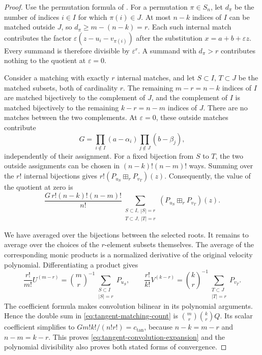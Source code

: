\documentclass[10pt,a4paper]{amsart}
\newcommand{\eps}{\varepsilon}
\begin{document}
\begin{proof}
Use the permutation formula of .  For a
permutation \(\pi\in S_n\), let \(d_\pi\) be the number of indices
\(i\in I\) for which \(\pi(i)\in J\).  At most \(n-k\) indices
of \(I\) can be matched outside \(J\), so
\(d_\pi\geq m-(n-k)=r\).  Each such internal match contributes
the factor \(\eps(z-u_i-v_{\pi(i)})\) after the substitution
\(x=a+b+\eps z\).  Every summand is therefore divisible by
\(\eps^r\).  A summand with \(d_\pi>r\) contributes nothing to
the quotient at \(\eps=0\).

Consider a matching with exactly \(r\) internal matches, and let
\(S\subset I\), \(T\subset J\) be the matched subsets, both of
cardinality \(r\).  The remaining \(m-r=n-k\) indices of \(I\)
are matched bijectively to the complement of \(J\), and the complement
of \(I\) is matched bijectively to the remaining \(k-r=n-m\)
indices of \(J\).  There are no matches between the two complements.
At \(\eps=0\), these outside matches contribute
\[
 G=\prod_{i\notin I}(a-\alpha_i)
       \prod_{j\notin J}(b-\beta_j),
\]
independently of their assignment.  For a fixed bijection from \(S\)
to \(T\), the two outside assignments can be chosen in
\((n-k)!(n-m)!\) ways.  Summing over the \(r!\) internal
bijections gives \(r!(P_{u_S}\boxplus_rP_{v_T})(z)\).  Consequently,
the value of the quotient at zero is
\begin{equation}\label{eq:tangent-matching-count}
 \frac{G\,r!(n-k)!(n-m)!}{n!}
 \sum_{\substack{S\subset I,\ |S|=r\\ T\subset J,\ |T|=r}}
       (P_{u_S}\boxplus_rP_{v_T})(z).
\end{equation}

We have averaged over the bijections between the selected roots. It remains to average over the choices of the \(r\)-element subsets themselves. The average of the corresponding monic products is a normalized derivative of the original velocity polynomial. Differentiating a product gives
\[
 \frac{r!}{m!}U^{(m-r)}
   =\binom mr^{-1}\sum_{\substack{S\subset I\\|S|=r}}P_{u_S},
 \qquad
 \frac{r!}{k!}V^{(k-r)}
   =\binom kr^{-1}\sum_{\substack{T\subset J\\|T|=r}}P_{v_T}.
\]
The coefficient formula makes convolution bilinear in its polynomial arguments. Hence the double sum in \eqref{eq:tangent-matching-count} is \(\binom mr\binom kr Q\). Its scalar coefficient simplifies to
\(Gm!k!/(n!r!)=c_{\mathrm{tan}}\), because \(n-k=m-r\) and \(n-m=k-r\). This proves \eqref{eq:tangent-convolution-expansion} and the polynomial divisibility also proves both stated forms of convergence.


\end{proof}
\end{document}
